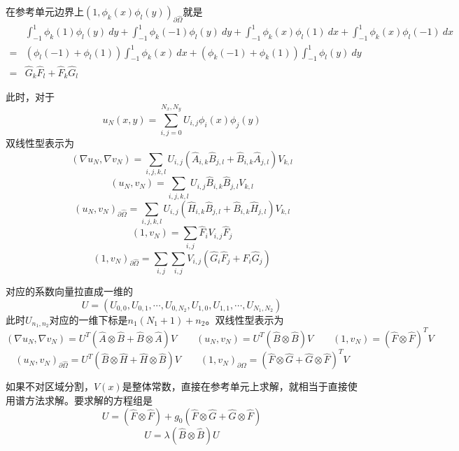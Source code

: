 \documentclass[UTF8,12pt]{article}
\begin{document}
在参考单元边界上$(1, \phi_k(x) \phi_l(y))_{\partial \hat{\Omega}}$就是
\begin{align*}
& \int_{-1}^{1} \phi_k(1) \phi_l(y) \ dy + \int_{-1}^{1} \phi_k(-1) \phi_l(y) \ dy + \int_{-1}^{1} \phi_k(x) \phi_l(1) \ dx + \int_{-1}^{1} \phi_k(x) \phi_l(-1) \ dx \\
= & (\phi_l(-1) + \phi_l(1)) \int_{-1}^{1} \phi_k(x) \ dx + (\phi_k(-1) + \phi_k(1)) \int_{-1}^{1} \phi_l(y) \ dy \\
= & \hat{G}_{k} \hat{F}_{l} + \hat{F}_{k} \hat{G}_{l}
\end{align*}

此时，对于
$$ u_N(x,y) = \sum_{i,j = 0}^{N_x, N_y} U_{i,j} \phi_{i}(x) \phi_{j}(y) $$
双线性型表示为
$$ (\nabla u_N, \nabla v_N) = \sum_{i,j,k,l} U_{i,j} (\hat{A}_{i,k} \hat{B}_{j,l} + \hat{B}_{i,k} \hat{A}_{j,l}) V_{k,l} $$
$$ (u_N, v_N) = \sum_{i,j,k,l} U_{i,j} \hat{B}_{i,k} \hat{B}_{j,l} V_{k,l} $$
$$ (u_N, v_N)_{\partial\hat{\Omega}} = \sum_{i,j,k,l} U_{i,j} (\hat{H}_{i,k} \hat{B}_{j,l} + \hat{B}_{i,k} \hat{H}_{j,l}) V_{k,l} $$
$$ (1, v_N) = \sum_{i,j} \hat{F}_i V_{i,j} \hat{F}_j $$
$$ (1, v_N)_{\partial\hat{\Omega}} = \sum_{i,j} \sum_{i,j} V_{i,j} (\hat{G}_i \hat{F}_j + \hat{F}_i \hat{G}_j)$$

对应的系数向量拉直成一维的
$$U = (U_{0,0}, U_{0,1}, \cdots, U_{0,N_2}, U_{1,0}, U_{1,1}, \cdots, U_{N_1,N_2})$$
此时$U_{n_1,n_2}$对应的一维下标是$n_1 (N_1+1) + n_2$。双线性型表示为
$$ (\nabla u_N, \nabla v_N) = U^T (\hat{A} \otimes \hat{B} + \hat{B} \otimes \hat{A}) V \qquad (u_N, v_N) = U^T (\hat{B} \otimes \hat{B}) V \qquad (1, v_N) = (\hat{F} \otimes \hat{F})^T V $$
$$ (u_N, v_N)_{\partial\hat{\Omega}} = U^T (\hat{B} \otimes \hat{H} + \hat{H} \otimes \hat{B}) V \qquad (1, v_N)_{\partial\hat{\Omega}} = (\hat{F} \otimes \hat{G} + \hat{G} \otimes \hat{F})^T V $$

如果不对区域分割，$V(x)$是整体常数，直接在参考单元上求解，就相当于直接使用谱方法求解。要求解的方程组是
\begin{equation}
[(\hat{A} \otimes \hat{B} + \hat{B} \otimes \hat{A}) + V (\hat{B} \otimes \hat{B}) + h_0 (\hat{B} \otimes \hat{H} + \hat{H} \otimes \hat{B})] U = (\hat{F} \otimes \hat{F}) + g_0 (\hat{F} \otimes \hat{G} + \hat{G} \otimes \hat{F})
\end{equation}
\begin{equation}
[(\hat{A} \otimes \hat{B} + \hat{B} \otimes \hat{A}) + V (\hat{B} \otimes \hat{B}) + h_0 (\hat{B} \otimes \hat{H} + \hat{H} \otimes \hat{B})] U = \lambda (\hat{B} \otimes \hat{B}) U
\end{equation}
\end{document}
